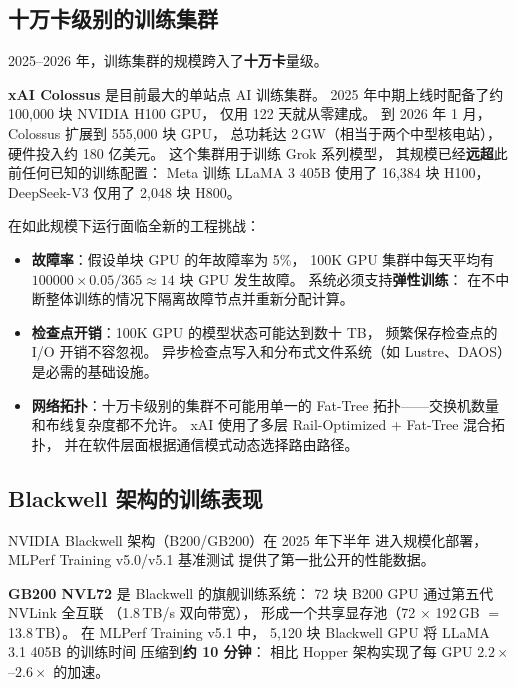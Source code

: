 \subsection{十万卡级别的训练集群}
\label{sec:100k-gpu}

2025--2026 年，训练集群的规模跨入了\textbf{十万卡}量级。

\textbf{xAI Colossus} 是目前最大的单站点 AI 训练集群。
2025 年中期上线时配备了约 100,000 块 NVIDIA H100 GPU，
仅用 122 天就从零建成。
到 2026 年 1 月，Colossus 扩展到 555,000 块 GPU，
总功耗达 2\,GW（相当于两个中型核电站），
硬件投入约 180 亿美元。
这个集群用于训练 Grok 系列模型，
其规模已经\textbf{远超}此前任何已知的训练配置：
Meta 训练 LLaMA 3 405B 使用了 16,384 块 H100，
DeepSeek-V3 仅用了 2,048 块 H800。

在如此规模下运行面临全新的工程挑战：
\begin{itemize}[noitemsep]
  \item \textbf{故障率}：假设单块 GPU 的年故障率为 5\%，
        100K GPU 集群中每天平均有
        $100000 \times 0.05 / 365 \approx 14$ 块 GPU 发生故障。
        系统必须支持\textbf{弹性训练}：
        在不中断整体训练的情况下隔离故障节点并重新分配计算。
  \item \textbf{检查点开销}：100K GPU 的模型状态可能达到数十 TB，
        频繁保存检查点的 I/O 开销不容忽视。
        异步检查点写入和分布式文件系统（如 Lustre、DAOS）
        是必需的基础设施。
  \item \textbf{网络拓扑}：十万卡级别的集群不可能用单一的
        Fat-Tree 拓扑——交换机数量和布线复杂度都不允许。
        xAI 使用了多层 Rail-Optimized + Fat-Tree 混合拓扑，
        并在软件层面根据通信模式动态选择路由路径。
\end{itemize}

\subsection{Blackwell 架构的训练表现}

NVIDIA Blackwell 架构（B200/GB200）在 2025 年下半年
进入规模化部署，MLPerf Training v5.0/v5.1 基准测试
提供了第一批公开的性能数据。

\textbf{GB200 NVL72} 是 Blackwell 的旗舰训练系统：
72 块 B200 GPU 通过第五代 NVLink 全互联
（1.8\,TB/s 双向带宽），
形成一个共享显存池（72 $\times$ 192\,GB $=$ 13.8\,TB）。
在 MLPerf Training v5.1 中，
5,120 块 Blackwell GPU 将 LLaMA 3.1 405B 的训练时间
压缩到\textbf{约 10 分钟}：
相比 Hopper 架构实现了每 GPU $2.2\times$--$2.6\times$ 的加速。

